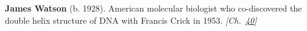 \nobelmedicine \textbf{James Watson} (b. 1928). American molecular biologist who co-discovered the double helix structure of DNA with Francis Crick in 1953. \emph{[Ch.~\hyperref[ch:dnasequencing]{40}]}

